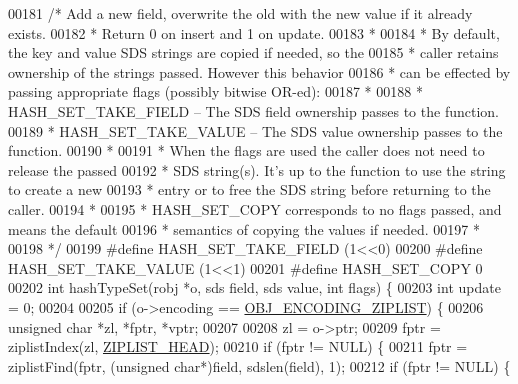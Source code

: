 \begin{DoxyCode}
00181 \textcolor{comment}{/* Add a new field, overwrite the old with the new value if it already exists.}
00182 \textcolor{comment}{ * Return 0 on insert and 1 on update.}
00183 \textcolor{comment}{ *}
00184 \textcolor{comment}{ * By default, the key and value SDS strings are copied if needed, so the}
00185 \textcolor{comment}{ * caller retains ownership of the strings passed. However this behavior}
00186 \textcolor{comment}{ * can be effected by passing appropriate flags (possibly bitwise OR-ed):}
00187 \textcolor{comment}{ *}
00188 \textcolor{comment}{ * HASH\_SET\_TAKE\_FIELD -- The SDS field ownership passes to the function.}
00189 \textcolor{comment}{ * HASH\_SET\_TAKE\_VALUE -- The SDS value ownership passes to the function.}
00190 \textcolor{comment}{ *}
00191 \textcolor{comment}{ * When the flags are used the caller does not need to release the passed}
00192 \textcolor{comment}{ * SDS string(s). It's up to the function to use the string to create a new}
00193 \textcolor{comment}{ * entry or to free the SDS string before returning to the caller.}
00194 \textcolor{comment}{ *}
00195 \textcolor{comment}{ * HASH\_SET\_COPY corresponds to no flags passed, and means the default}
00196 \textcolor{comment}{ * semantics of copying the values if needed.}
00197 \textcolor{comment}{ *}
00198 \textcolor{comment}{ */}
00199 \textcolor{preprocessor}{#}\textcolor{preprocessor}{define} \textcolor{preprocessor}{HASH\_SET\_TAKE\_FIELD} \textcolor{preprocessor}{(}1\textcolor{preprocessor}{<<}0\textcolor{preprocessor}{)}
00200 \textcolor{preprocessor}{#}\textcolor{preprocessor}{define} \textcolor{preprocessor}{HASH\_SET\_TAKE\_VALUE} \textcolor{preprocessor}{(}1\textcolor{preprocessor}{<<}1\textcolor{preprocessor}{)}
00201 \textcolor{preprocessor}{#}\textcolor{preprocessor}{define} \textcolor{preprocessor}{HASH\_SET\_COPY} 0
00202 \textcolor{keywordtype}{int} hashTypeSet(robj *o, sds field, sds value, \textcolor{keywordtype}{int} flags) \{
00203     \textcolor{keywordtype}{int} update = 0;
00204 
00205     \textcolor{keywordflow}{if} (o->encoding == \hyperlink{server_8h_aabf064ede983103f1fd0df2086e84eee}{OBJ\_ENCODING\_ZIPLIST}) \{
00206         \textcolor{keywordtype}{unsigned} \textcolor{keywordtype}{char} *zl, *fptr, *vptr;
00207 
00208         zl = o->ptr;
00209         fptr = ziplistIndex(zl, \hyperlink{ziplist_8h_a88d32e547c509220e1c50cd9306186ba}{ZIPLIST\_HEAD});
00210         \textcolor{keywordflow}{if} (fptr != NULL) \{
00211             fptr = ziplistFind(fptr, (\textcolor{keywordtype}{unsigned} \textcolor{keywordtype}{char}*)field, sdslen(field), 1);
00212             \textcolor{keywordflow}{if} (fptr != NULL) \{

\end{DoxyCode}
